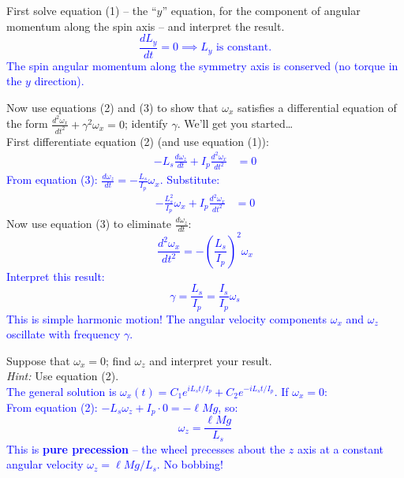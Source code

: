 \documentclass[11pt, letterpaper, openany]{book}
\newenvironment{exercise}[1][Exercise]{%
  \tcolorbox[blanker, breakable, left=1em,
    before skip=1em, after skip=1em,
    borderline west={3pt}{0pt}{PhysNavy},
    colback=PhysCream,
    before upper={\textcolor{PhysNavy}{\sffamily\bfseries #1:}\space}
  ]%
}{%
  \endtcolorbox%
}
\begin{document}
\begin{exercise}[Exercise 5]
First solve equation (1) -- the ``$y$'' equation, for the component of angular momentum along the spin axis -- and interpret the result. \\
\textcolor{blue}{
\[ \frac{dL_y}{dt} = 0 \implies L_y \text{ is constant.} \]
The spin angular momentum along the symmetry axis is conserved (no torque in the $y$ direction).
}
\end{exercise}

\begin{exercise}[Exercise 6]
Now use equations (2) and (3) to show that $\omega_x$ satisfies a differential equation of the form $\frac{d^2\omega_x}{dt^2} + \gamma^2 \omega_x = 0$; identify $\gamma$. We'll get you started\ldots \\
First differentiate equation (2) (and use equation (1)):
\textcolor{blue}{
\begin{align*}
    -L_s\frac{d\omega_z}{dt} + I_p\frac{d^2\omega_x}{dt^2} &= 0
\end{align*}
From equation (3): $\frac{d\omega_z}{dt} = -\frac{L_s}{I_p}\omega_x$. Substitute:
\begin{align*}
    -\frac{L_s^2}{I_p}\omega_x + I_p\frac{d^2\omega_x}{dt^2} &= 0
\end{align*}
}
Now use equation (3) to eliminate $\frac{d\omega_z}{dt}$: \\
\textcolor{blue}{
\[ \frac{d^2\omega_x}{dt^2} = -\left(\frac{L_s}{I_p}\right)^2 \omega_x \]
Interpret this result:
\[ \gamma = \frac{L_s}{I_p} = \frac{I_s}{I_p}\omega_s \]
This is simple harmonic motion! The angular velocity components $\omega_x$ and $\omega_z$ oscillate with frequency $\gamma$.
}
\end{exercise}

\begin{exercise}[Exercise 7]
Suppose that $\omega_x = 0$; find $\omega_z$ and interpret your result. \\
\textit{Hint:} Use equation (2). \\
\textcolor{blue}{
The general solution is $\omega_x(t) = C_1 e^{iL_s t/I_p} + C_2 e^{-iL_s t/I_p}$. If $\omega_x = 0$: \\
From equation (2): $-L_s\omega_z + I_p \cdot 0 = -\ell Mg$, so:
\[ \omega_z = \frac{\ell Mg}{L_s} \]
This is \textbf{pure precession} -- the wheel precesses about the $z$ axis at a constant angular velocity $\omega_z = \ell Mg / L_s$. No bobbing!
}
\end{exercise}
\end{document}
